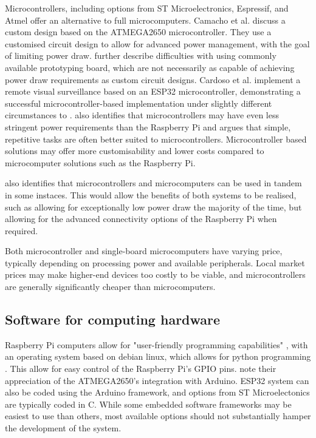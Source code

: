 \documentclass[class=report,11pt,crop=false]{standalone}
\begin{document}
Microcontrollers, including options from ST Microelectronics, Espressif, and Atmel offer an alternative to full microcomputers. Camacho et al. \cite{camacho2017deployment} discuss a custom design based on the ATMEGA2650 microcontroller. They use a customised circuit design to allow for advanced power management, with the goal of limiting power draw. \cite{camacho2017deployment} further describe difficulties with using commonly available prototyping board, which are not necessarily as capable of achieving power draw requirements as custom circuit designs. Cardoso et al. \cite{cardoso2022internet} implement a remote visual surveillance based on an ESP32 microcontroller, demonstrating a successful microcontroller-based implementation under slightly different circumstances to \cite{camacho2017deployment}. \cite{jolles2021broad-scale} also identifies that microcontrollers may have even less stringent power requirements than the Raspberry Pi and argues that simple, repetitive tasks are often better suited to microcontrollers. Microcontroller based solutions may offer more customisability and lower costs compared to microcomputer solutions such as the Raspberry Pi.

 \cite{jolles2021broad-scale} also identifies that microcontrollers and microcomputers can be used in tandem in some instaces. This would allow the benefits of both systems to be realised, such as allowing for exceptionally low power draw the majority of the time, but allowing for the advanced connectivity options of the Raspberry Pi when required.

Both microcontroller and single-board microcomputers have varying price, typically depending on processing power and available peripherals. Local market prices may make higher-end devices too costly to be viable, and microcontrollers are generally significantly cheaper than microcomputers.

\subsection{Software for computing hardware}

Raspberry Pi computers allow for "user-friendly programming capabilities" \cite{jolles2021broad-scale}, with an operating system based on debian linux, which allows for python programming \cite{prinz2016a}. This allow for easy control of the Raspberry Pi's GPIO pins. \cite{camacho2017deployment} note their appreciation of the ATMEGA2650's integration with Arduino. ESP32 system can also be coded using the Arduino framework, and options from ST Microelectonics are typically coded in C. While some embedded software frameworks may be easiest to use than others, most available options should not substantially hamper the development of the system.
\end{document}
